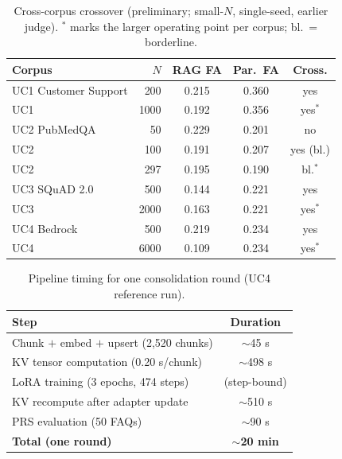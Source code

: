 \begin{table}[!htbp]
\centering
\caption{Cross-corpus crossover (preliminary; small-$N$, single-seed, earlier judge). $^\ast$ marks the larger operating point per corpus; bl.\ = borderline.}
\label{tab:crossover-tab}
\small
\begin{tabularx}{\columnwidth}{@{}L r c c c@{}}
\toprule
Corpus & $N$ & RAG FA & Par.\ FA & Cross. \\
\midrule
UC1 Customer Support & 200 & 0.215 & 0.360 & yes \\
UC1 & 1000 & 0.192 & 0.356 & yes$^\ast$ \\
UC2 PubMedQA & 50 & 0.229 & 0.201 & no \\
UC2 & 100 & 0.191 & 0.207 & yes (bl.) \\
UC2 & 297 & 0.195 & 0.190 & bl.$^\ast$ \\
UC3 SQuAD 2.0 & 500 & 0.144 & 0.221 & yes \\
UC3 & 2000 & 0.163 & 0.221 & yes$^\ast$ \\
UC4 Bedrock & 500 & 0.219 & 0.234 & yes \\
UC4 & 6000 & 0.109 & 0.234 & yes$^\ast$ \\
\bottomrule
\end{tabularx}
\end{table}

\begin{table}[!htbp]
\centering
\caption{Pipeline timing for one consolidation round (UC4 reference run).}
\label{tab:timing}
\small
\begin{tabularx}{\columnwidth}{@{}L c@{}}
\toprule
Step & Duration \\
\midrule
Chunk $+$ embed $+$ upsert (2,520 chunks) & $\sim$45 s \\
KV tensor computation (0.20 s/chunk) & $\sim$498 s \\
LoRA training (3 epochs, 474 steps) & (step-bound) \\
KV recompute after adapter update & $\sim$510 s \\
PRS evaluation (50 FAQs) & $\sim$90 s \\
\textbf{Total (one round)} & \textbf{$\sim$20 min} \\
\bottomrule
\end{tabularx}
\end{table}

